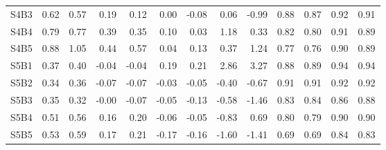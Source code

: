 \begin{tabular}{lrrrrrrrrrrrr}
S4B3 & 0.62 & 0.57 & 0.19 & 0.12 & 0.00 & -0.08 & 0.06 & -0.99 & 0.88 & 0.87 & 0.92 & 0.91 \\
S4B4 & 0.79 & 0.77 & 0.39 & 0.35 & 0.10 & 0.03 & 1.18 & 0.33 & 0.82 & 0.80 & 0.91 & 0.89 \\
S4B5 & 0.88 & 1.05 & 0.44 & 0.57 & 0.04 & 0.13 & 0.37 & 1.24 & 0.77 & 0.76 & 0.90 & 0.89 \\
S5B1 & 0.37 & 0.40 & -0.04 & -0.04 & 0.19 & 0.21 & 2.86 & 3.27 & 0.88 & 0.89 & 0.94 & 0.94 \\
S5B2 & 0.34 & 0.36 & -0.07 & -0.07 & -0.03 & -0.05 & -0.40 & -0.67 & 0.91 & 0.91 & 0.92 & 0.92 \\
S5B3 & 0.35 & 0.32 & -0.00 & -0.07 & -0.05 & -0.13 & -0.58 & -1.46 & 0.83 & 0.84 & 0.86 & 0.88 \\
S5B4 & 0.51 & 0.56 & 0.16 & 0.20 & -0.06 & -0.05 & -0.83 & 0.69 & 0.80 & 0.79 & 0.90 & 0.90 \\
S5B5 & 0.53 & 0.59 & 0.17 & 0.21 & -0.17 & -0.16 & -1.60 & -1.41 & 0.69 & 0.69 & 0.84 & 0.83 \\
\bottomrule
\end{tabular}
